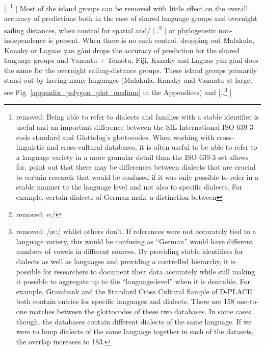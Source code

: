\documentclass[unnumsec,webpdf,modern,medium]{oup-authoring-template}
\providecommand{\DIFaddtex}[1]{{\protect\color{blue} \sf #1}} %
\providecommand{\DIFdeltex}[1]{{\protect\color{red} [..\footnote{removed: #1} ]}} %
\providecommand{\DIFaddbegin}{} %
\providecommand{\DIFaddend}{} %
\providecommand{\DIFdelbegin}{} %
\providecommand{\DIFdelend}{} %
\providecommand{\DIFadd}[1]{\texorpdfstring{\DIFaddtex{#1}}{#1}} %
\providecommand{\DIFdel}[1]{\texorpdfstring{\DIFdeltex{#1}}{}} %
\newcommand{\DIFscaledelfig}{0.5}
\newlength{\DIFdelgraphicswidth} %
\newlength{\DIFdelgraphicsheight} %
\newcommand{\DIFaddincludegraphics}[2][]{{\color{blue}\fbox{\DIFOincludegraphics[#1]{#2}}}} %
\newcommand{\DIFdelincludegraphics}[2][]{%
\sbox{\DIFdelgraphicsbox}{\DIFOincludegraphics[#1]{#2}}%
\settoboxwidth{\DIFdelgraphicswidth}{\DIFdelgraphicsbox} %
\settoboxtotalheight{\DIFdelgraphicsheight}{\DIFdelgraphicsbox} %
\scalebox{\DIFscaledelfig}{%
\parbox[b]{\DIFdelgraphicswidth}{\usebox{\DIFdelgraphicsbox}\\[-\baselineskip] \rule{\DIFdelgraphicswidth}{0em}}\llap{\resizebox{\DIFdelgraphicswidth}{\DIFdelgraphicsheight}{%
\setlength{\unitlength}{\DIFdelgraphicswidth}%
\begin{picture}(1,1)%
\thicklines\linethickness{2pt} %
{\color[rgb]{1,0,0}\put(0,0){\framebox(1,1){}}}%
{\color[rgb]{1,0,0}\put(0,0){\line( 1,1){1}}}%
{\color[rgb]{1,0,0}\put(0,1){\line(1,-1){1}}}%
\end{picture}%
}\hspace*{3pt}}} %
} %
\DeclareRobustCommand{\DIFaddbegin}{\DIFOaddbegin \let\includegraphics\DIFaddincludegraphics} %
\DeclareRobustCommand{\DIFaddend}{\DIFOaddend \let\includegraphics\DIFOincludegraphics} %
\DeclareRobustCommand{\DIFdelbegin}{\DIFOdelbegin \let\includegraphics\DIFdelincludegraphics} %
\DeclareRobustCommand{\DIFdelend}{\DIFOaddend \let\includegraphics\DIFOincludegraphics} %
\begin{document}

\DIFdel{Being able to refer to dialects and families with a stable identifier is useful and an important difference between the SIL International ISO 639-3 code standard and Glottolog's glottocodes. When working with cross-linguistic and cross-cultural databases, it is often useful to be able to refer to a language variety in a more granular detail than the ISO 639-3 set allows for. \citet{nordhoff2011glottolog} point out that there may be differences between dialects that are crucial to certain research that would be confused if it was only possible to refer in a stable manner to the language level and not also to specific dialects. For example, certain dialects of German make a distinction between }\DIFdelend \DIFaddbegin \DIFadd{Most of the island groups can be removed with little effect on the overall accuracy of predictions both in the case of shared language groups and overnight sailing distances, when control for spatial and}\DIFaddend /\DIFdelbegin \DIFdel{e:/ }\DIFdelend \DIFaddbegin \DIFadd{or phylogenetic non-independence is present. When there is no such control, dropping out Malakula, Kanaky or Laguas yan gåni drops the accuracy of prediction for the shared language groups and Vanuatu + Temotu, Fiji, Kanaky and Laguas yan gåni does the same for the overnight sailing-distance groups. These island groups primarily stand out by having many languages (Malakula, Kanaky and Vanuatu at large, see Fig. \ref{appendix_polygon_plot_medium} in the Appendices) }\DIFaddend and \DIFdelbegin \DIFdel{/æ:/ whilst others don't. If references were not accurately tied to a language variety, this would be confusing as ``German'' would have different numbers of vowels in different sources. By providing stable identifiers for dialects as well as languages and providing a controlled hierarchy, it is possible for researchers to document their data accurately while still making it possible to aggregate up to the ``language-level'' when it is desirable. For example, Grambank and the Standard Cross Cultural Sample of D-PLACE both contain entries for specific languages and dialects. There are 158 one-to-one matches between the glottocodes of these two databases. In some cases though, the databases contain different dialects of the same language. If we were to lump dialects of the same language together in each of the datasets, the overlap increases to 183.
}%
\end{document}
